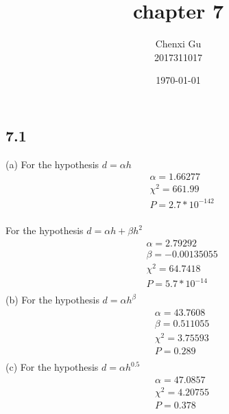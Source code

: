\documentclass{article}
\begin{document}
\begin{CJK*}{GBK}{song}

\pagestyle{fancy}  
\fancyhead{} %
\renewcommand{\headrulewidth}{0.4pt}  
\renewcommand{\footrulewidth}{0.4pt} 



\title {chapter 7}
\author{Chenxi Gu\\2017311017}

\date{\today}

\maketitle

\section{7.1}
(a)
For the hypothesis $d=\alpha h$
\begin{equation}
\begin{aligned}
&\alpha =1.66277\\
&\chi^2=661.99\\
&P=2.7*10^{-142}\\
\end{aligned}
\end{equation}

For the hypothesis $d=\alpha h+\beta h^2$
\begin{equation}
\begin{aligned}
&\alpha =2.79292\\
&\beta =-0.00135055\\
&\chi^2=64.7418\\
&P=5.7*10^{-14}\\
\end{aligned}
\end{equation}
(b)
For the hypothesis $d=\alpha h^{\beta}$
\begin{equation}
\begin{aligned}
&\alpha =43.7608\\
&\beta =0.511055\\
&\chi^2=3.75593\\
&P=0.289\\
\end{aligned}
\end{equation}
(c)
For the hypothesis $d=\alpha h^{0.5}$
\begin{equation}
\begin{aligned}
&\alpha =47.0857\\
&\chi^2=4.20755\\
&P=0.378\\
\end{aligned}
\end{equation}



\end{CJK*}
\end{document}
